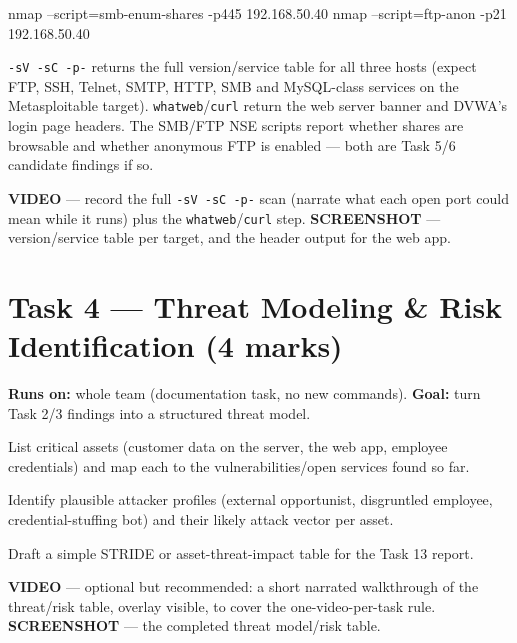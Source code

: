 \documentclass[11pt,a4paper]{article}
\begin{document}
\begin{cmdbox}
\begin{cmdverb}
nmap --script=smb-enum-shares -p445 192.168.50.40
nmap --script=ftp-anon        -p21  192.168.50.40
\end{cmdverb}
\end{cmdbox}

\begin{expectbox}
\texttt{-sV -sC -p-} returns the full version/service table for all three hosts
(expect FTP, SSH, Telnet, SMTP, HTTP, SMB and MySQL-class services on the
Metasploitable target). \texttt{whatweb}/\texttt{curl} return the web server banner and
DVWA's login page headers. The SMB/FTP NSE scripts report whether shares are
browsable and whether anonymous FTP is enabled --- both are Task 5/6 candidate
findings if so.
\end{expectbox}

\begin{notebox}
\textbf{VIDEO} --- record the full \texttt{-sV -sC -p-} scan (narrate what each open
port could mean while it runs) plus the \texttt{whatweb}/\texttt{curl} step.
\textbf{SCREENSHOT} --- version/service table per target, and the header output for
the web app.
\end{notebox}

\clearpage

\section{Task 4 --- Threat Modeling \& Risk Identification (4 marks)}
\textbf{Runs on:} whole team (documentation task, no new commands). \quad\textbf{Goal:}
turn Task 2/3 findings into a structured threat model.

\begin{steps}
\item List critical assets (customer data on the server, the web app, employee
  credentials) and map each to the vulnerabilities/open services found so far.
\item Identify plausible attacker profiles (external opportunist, disgruntled
  employee, credential-stuffing bot) and their likely attack vector per asset.
\item Draft a simple STRIDE or asset-threat-impact table for the Task 13 report.
\end{steps}

\begin{notebox}
\textbf{VIDEO} --- optional but recommended: a short narrated walkthrough of the
threat/risk table, overlay visible, to cover the one-video-per-task rule.
\textbf{SCREENSHOT} --- the completed threat model/risk table.
\end{notebox}
\end{document}
